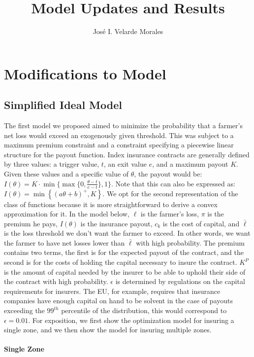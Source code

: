 \documentclass[11pt]{article}
\title{Model Updates and Results}
\author{José I. Velarde Morales}
\begin{document}
\maketitle
\section{Modifications to Model}
    \subsection{Simplified Ideal Model}

    The first model we proposed aimed to minimize the probability that a farmer's net loss would exceed an exogenously given threshold. This was subject to a maximum premium constraint and a constraint specifying a piecewise linear structure for the payout function. Index insurance contracts are generally defined by three values: a trigger value, $t$, an exit value $e$, and a maximum payout $K$. Given these values and a specific value of $\theta$, the payout would be: $I(\theta) = K \cdot \min \{ \max \{0,\frac{\theta - t}{e-t} \},1 \}$. Note that this can also be expressed as: $I(\theta) = \min \left \{(a\theta +b)^+,K \right \}$. We opt for the second representation of the class of functions because it is more straightforward to derive a convex approximation for it. In the model below, $\ell$ is the farmer's loss, $\pi$ is the premium he pays, $I(\theta)$ is the insurance payout, $c_k$ is the cost of capital, and $\bar{\ell}$ is the loss threshold we don't want the farmer to exceed. In other words, we want the farmer to have net losses lower than $\bar{\ell}$ with high probability. The premium contains two terms, the first is for the expected payout of the contract, and the second is for the costs of holding the capital necessary to insure the contract. $K^P$ is the amount of capital needed by the insurer to be able to uphold their side of the contract with high probability. $\epsilon$ is determined by regulations on the capital requirements for insurers. The EU, for example, requires that insurance companies have enough capital on hand to be solvent in the case of payouts exceeding the $99^{th}$ percentile of the distribution, this would correspond to $\epsilon=0.01$. For exposition, we first show the optimization model for insuring a single zone, and we then show the model for insuring multiple zones.

    \paragraph*{Single Zone}
\end{document}
